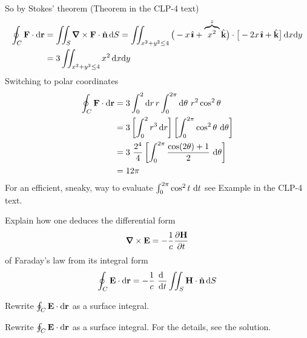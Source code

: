 \begin{solution}
So by Stokes' theorem (Theorem  in the CLP-4 text) 
\begin{align*}
\oint_C\vF\cdot\dee{\vr}
&=\dblInt_S \vnabla\times\vF \cdot \hn\,\dee{S}
=\dblInt_{x^2+y^2\le 4} \big(-x\,\hi + \overbrace{x^2}^{z}\hk\big)\cdot
\big[-2x\,\hi+\hk\big]\,\dee{x}\dee{y} \\
&=3\dblInt_{x^2+y^2\le 4} x^2\,\dee{x}\dee{y}
\end{align*}
Switching to polar coordinates
\begin{align*}
\oint_C\mathbf{F}\cdot\mathrm{d}\mathbf{r}
&=3\int_0^2\mathrm{d}r\,r\int_0^{2\pi}\mathrm{d}\theta\ r^2\cos^2\theta \\
&=3\left[\int_0^2 r^3\,\mathrm{d}r\right]
           \left[\int_0^{2\pi}\cos^2\theta\ \mathrm{d}\theta\right] \\
&= 3\ \frac{2^4}{4} 
       \left[\int_0^{2\pi}\frac{\cos(2\theta)+1}{2}\ \mathrm{d}\theta\right] \\
&= 12\pi
\end{align*}
For an efficient, sneaky, way to evaluate 
$\int_0^{2\pi} \cos^2 t\ \mathrm{d}t$ see Example
 in the CLP-4 text.

\end{solution}

\begin{question}[M317 2005A] %
Explain how one deduces the differential form
\begin{equation*}
\vnabla\times\vE = -\frac{1}{c}\frac{\partial\vH}{\partial t}
\end{equation*}
of Faraday's law from its integral form
\begin{equation*}
\oint_C\vE\cdot\dee{\vr} = 
  -\frac{1}{c}\ \diff{\hfill}{t}\dblInt_S\vH\cdot\hn\,\dee{S}
\end{equation*}
\end{question}

\begin{hint} 
Rewrite $\oint_C\mathbf{E}\cdot\mathrm{d}\mathbf{r}$ as a surface integral.
\end{hint}

\begin{answer} 
Rewrite $\oint_C\mathbf{E}\cdot\mathrm{d}\mathbf{r}$ as a surface integral.  For the details,
see the solution.
\end{answer}


